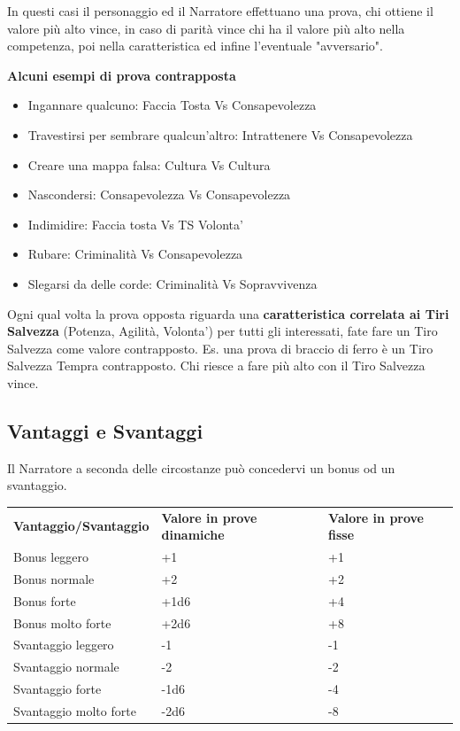 \documentclass[a4paper,11pt,twoside,openany]{book}
\begin{document}
In questi casi il personaggio ed il Narratore effettuano una prova, chi ottiene il valore più alto vince, in caso di parità vince chi ha il valore più alto nella competenza, poi nella caratteristica ed infine l'eventuale "avversario".

\bigskip

\textbf{Alcuni esempi di prova contrapposta}

\begin{itemize}
\item Ingannare qualcuno: Faccia Tosta Vs Consapevolezza
\item Travestirsi per sembrare qualcun'altro: Intrattenere Vs Consapevolezza
\item Creare una mappa falsa: Cultura Vs Cultura
\item Nascondersi: Consapevolezza Vs Consapevolezza
\item Indimidire: Faccia tosta Vs TS Volonta'
\item Rubare: Criminalità Vs Consapevolezza
\item Slegarsi da delle corde: Criminalità Vs Sopravvivenza
\end{itemize}

Ogni qual volta la prova opposta riguarda una \textbf{caratteristica correlata ai Tiri Salvezza} (Potenza, Agilità, Volonta') per tutti gli interessati, fate fare un Tiro Salvezza come valore contrapposto. Es. una prova di braccio di ferro è un Tiro Salvezza Tempra contrapposto. Chi riesce a fare più alto con il Tiro Salvezza vince.

\bigskip

\subsection{Vantaggi e Svantaggi}

Il Narratore a seconda delle circostanze può concedervi un bonus od un svantaggio.

\bigskip

\begin{tabular}{lll}
\toprule
\textbf{Vantaggio/Svantaggio} & \textbf{Valore in prove dinamiche} & \textbf{Valore in prove fisse}\tabularnewline
Bonus leggero & +1 & +1\tabularnewline
Bonus normale & +2 & +2\tabularnewline
Bonus forte & +1d6 & +4\tabularnewline
Bonus molto forte & +2d6 & +8\tabularnewline
Svantaggio leggero & -1 & -1\tabularnewline
Svantaggio normale & -2 & -2\tabularnewline
Svantaggio forte & -1d6 & -4\tabularnewline
Svantaggio molto forte & -2d6 & -8\tabularnewline

\end{tabular}
\end{document}
